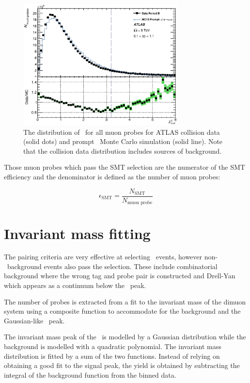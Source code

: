 \begin{figure}[htbp]
  \centering
  \includegraphics[width=0.75\textwidth]{PartCalibration2012/Plots/Kinematics/h_muonprobe_matchchi2_ndof_Nominal.eps}
  \caption{The distribution of \xsd\ for all muon probes for ATLAS collision data (solid dots) and prompt \jpsi\ Monte Carlo simulation (solid line). Note that the collision data distribution includes sources of background.} \label{fig:CalibrationMatchChi2Dist}
\end{figure}

Those muon probes which pass the SMT selection are the numerator of the SMT efficiency and the denominator is defined as the number of muon probes:

\begin{equation}
  \epsilon_{\textrm{SMT}} = \frac{N_{\textrm{SMT}}}{N_{\textrm{muon probe}}}
\end{equation}

\section{Invariant mass fitting} \label{sec:CalibrationFitting}

The pairing criteria are very effective at selecting \jpsi\ events, however non-\jpsi\ background events also pass the selection. These include combinatorial background where the wrong tag and probe pair is constructed and Drell-Yan which appears as a continuum below the \jpsi\ peak.

The number of probes is extracted from a fit to the invariant mass of the dimuon system using a composite function to accommodate for the background and the Gaussian-like \jpsi\ peak. 

The invariant mass peak of the \jpsi\ is modelled by a Gaussian distribution while the background is modelled with a quadratic polynomial. The invariant mass distribution is fitted by a sum of the two functions. Instead of relying on obtaining a good fit to the signal peak, the yield is obtained by subtracting the integral of the background function from the binned data.

